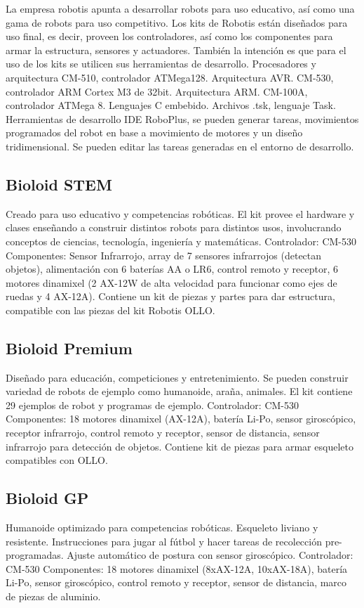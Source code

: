 
La empresa robotis apunta a desarrollar robots para uso educativo, así como una gama de robots para uso competitivo. Los kits de Robotis están diseñados para uso final, es decir, proveen los controladores, así como los componentes para armar la estructura, sensores y actuadores. También la intención es que para el uso de los kits se utilicen sus herramientas de desarrollo.
Procesadores y arquitectura
  CM-510, controlador ATMega128. Arquitectura AVR.
  CM-530, controlador ARM Cortex M3 de 32bit. Arquitectura ARM.
  CM-100A, controlador ATMega 8.
Lenguajes
  C embebido. Archivos .tsk, lenguaje Task.
Herramientas de desarrollo
  IDE RoboPlus, se pueden generar tareas, movimientos programados del robot en base a movimiento de motores y un diseño tridimensional. Se pueden editar las tareas generadas en el entorno de desarrollo.


\subsection{Bioloid STEM}
Creado para uso educativo y competencias robóticas. El kit provee el hardware y clases enseñando a construir distintos robots para distintos usos, involucrando conceptos de ciencias, tecnología, ingeniería y matemáticas.
Controlador:
CM-530
Componentes:
Sensor Infrarrojo, array de 7 sensores infrarrojos (detectan objetos), alimentación con 6 baterías AA o LR6, control remoto y receptor, 6 motores dinamixel (2 AX-12W de alta velocidad para funcionar como ejes de ruedas y 4 AX-12A). Contiene un kit de piezas y partes para dar estructura, compatible con las piezas del kit Robotis OLLO.

\subsection{Bioloid Premium}
Diseñado para educación, competiciones y entretenimiento. Se pueden construir variedad de robots de ejemplo como humanoide, araña, animales. El kit contiene 29 ejemplos de robot y programas de ejemplo.
Controlador:
CM-530
Componentes:
18 motores dinamixel (AX-12A), batería Li-Po, sensor giroscópico, receptor infrarrojo, control remoto y receptor, sensor de distancia, sensor infrarrojo para detección de objetos. Contiene kit de piezas para armar esqueleto compatibles con OLLO.

\subsection{Bioloid GP}
Humanoide optimizado para competencias robóticas. Esqueleto liviano y resistente. Instrucciones para jugar al fútbol y hacer tareas de recolección pre-programadas. Ajuste automático de postura con sensor giroscópico.
Controlador:
CM-530
Componentes:
18 motores dinamixel (8xAX-12A, 10xAX-18A), batería Li-Po, sensor giroscópico, control remoto y receptor, sensor de distancia, marco de piezas de aluminio.

